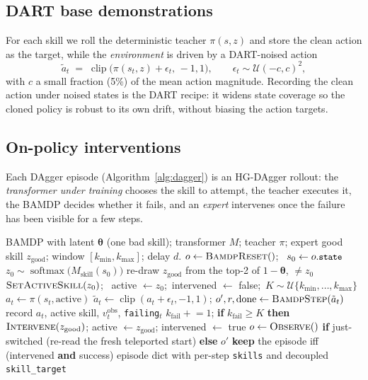 \documentclass[11pt]{article}
\newcommand{\st}{s}
\newcommand{\theem}{\bm{\theta}}
\newcommand{\skill}{z}
\newcommand{\softmax}{\operatorname{softmax}}
\newcommand{\Unif}{\mathcal{U}}
\newcommand{\code}[1]{\texttt{\small #1}}
\begin{document}
\subsection{DART base demonstrations}
For each skill we roll the deterministic teacher $\pi(\st,\skill)$ and store the clean
action as the target, while the \emph{environment} is driven by a DART-noised action
\begin{equation}
\tilde a_t \;=\; \operatorname{clip}\big(\pi(\st_t,\skill) + \epsilon_t,\,-1,1\big),
\qquad \epsilon_t\sim\Unif(-c,c)^2,
\end{equation}
with $c$ a small fraction (5\%) of the mean action magnitude. Recording the clean
action under noised states is the DART recipe: it widens state coverage so the cloned
policy is robust to its own drift, without biasing the action targets.

\subsection{On-policy interventions}
Each DAgger episode (Algorithm~\ref{alg:dagger}) is an HG-DAgger rollout: the
\emph{transformer under training} chooses the skill to attempt, the teacher executes
it, the BAMDP decides whether it fails, and an \emph{expert} intervenes once the
failure has been visible for a few steps.

\begin{algorithm}[t]
\caption{Collect one HG-DAgger intervention episode (\code{collect\_dagger\_episode})}
\label{alg:dagger}
\begin{algorithmic}[1]
\Require BAMDP with latent $\theem$ (one bad skill); transformer $M$; teacher $\pi$;
expert good skill $\skill_{\mathrm{good}}$; window $[k_{\min},k_{\max}]$; delay $d$.
\State $o\gets\textsc{BamdpReset}()$; \ $\st_0\gets o.\code{state}$
\State $\skill_0\sim \softmax\big(M_{\mathrm{skill}}(\st_0)\big)$
\If{$\skill_{\mathrm{good}}=\skill_0$} re-draw $\skill_{\mathrm{good}}$ from the top-2
of $1-\theem$, $\neq \skill_0$ \EndIf
\State $\textsc{SetActiveSkill}(\skill_0)$; \ active $\gets\skill_0$;\ intervened
$\gets$ false;\ $K\sim\Unif\{k_{\min},\dots,k_{\max}\}$
  \State $a_t \gets \pi(\st_t,\text{active})$
  \State $\tilde a_t \gets \operatorname{clip}(a_t+\epsilon_t,-1,1)$;\quad
         $o',r,\text{done}\gets\textsc{BamdpStep}(\tilde a_t)$
  \State record $a_t$, active skill, $v^{\mathrm{obs}}_t$, \code{failing}$_t$
  \If{$\neg$intervened \textbf{and} \code{failing}$_t$}
     \State $k_{\mathrm{fail}}\!\mathrel{+}=\!1$;\quad
            \textbf{if } $k_{\mathrm{fail}}\ge K$ \textbf{ then }
            $\textsc{Intervene}(\skill_{\mathrm{good}})$; active $\gets
            \skill_{\mathrm{good}}$; intervened $\gets$ true
  \EndIf
  \State $o \gets \textsc{Observe}()$ \textbf{if} just-switched (re-read the fresh
         teleported start) \textbf{else} $o'$
\EndWhile
\State \textbf{keep} the episode iff (intervened \textbf{and} success)
\State \Return episode dict with per-step \code{skills} and decoupled
\code{skill\_target}
\end{algorithmic}
\end{algorithm}
\end{document}
